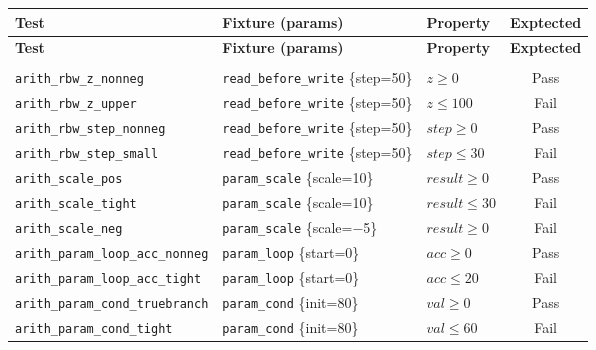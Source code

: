 {\small
\begin{longtable}{p{} p{} p{} c}
\toprule
\textbf{Test} & \textbf{Fixture (params)} & \textbf{Property} & \textbf{Exptected} \\
\midrule
\endfirsthead
\toprule
\textbf{Test} & \textbf{Fixture (params)} & \textbf{Property} & \textbf{Exptected} \\
\midrule
\endhead
\bottomrule
\endfoot
\bottomrule
\endlastfoot

\multicolumn{4}{l}{\textit{Arithmetic (TestSpecificArithmetic - 11 tests)}} \\
\midrule
\texttt{arith\_rbw\_z\_nonneg}             & \texttt{read\_before\_write} \newline \{step=50\}  & $z \geq 0$           & Pass \\
\texttt{arith\_rbw\_z\_upper}              & \texttt{read\_before\_write} \newline \{step=50\}  & $z \leq 100$         & Fail \\
\texttt{arith\_rbw\_step\_nonneg}          & \texttt{read\_before\_write} \newline \{step=50\}  & $\mathit{step} \geq 0$ & Pass \\
\texttt{arith\_rbw\_step\_small}           & \texttt{read\_before\_write} \newline \{step=50\}  & $\mathit{step} \leq 30$ & Fail \\
\texttt{arith\_scale\_pos}                 & \texttt{param\_scale} \newline \{scale=10\}       & $\mathit{result} \geq 0$ & Pass \\
\texttt{arith\_scale\_tight}               & \texttt{param\_scale} \newline \{scale=10\}       & $\mathit{result} \leq 30$ & Fail \\
\texttt{arith\_scale\_neg}                 & \texttt{param\_scale} \newline \{scale=$-$5\}     & $\mathit{result} \geq 0$ & Fail \\
\texttt{arith\_param\_loop\_acc\_nonneg}   & \texttt{param\_loop} \newline \{start=0\}         & $\mathit{acc} \geq 0$ & Pass \\
\texttt{arith\_param\_loop\_acc\_tight}    & \texttt{param\_loop} \newline \{start=0\}         & $\mathit{acc} \leq 20$ & Fail \\
\texttt{arith\_param\_cond\_truebranch}    & \texttt{param\_cond} \newline \{init=80\}         & $\mathit{val} \geq 0$ & Pass \\
\texttt{arith\_param\_cond\_tight}         & \texttt{param\_cond} \newline \{init=80\}         & $\mathit{val} \leq 60$ & Fail \\


\end{longtable}}
